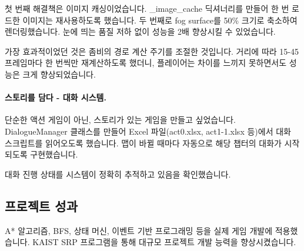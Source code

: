첫 번째 해결책은 이미지 캐싱이었습니다. \_image\_cache 딕셔너리를 만들어 한 번 로드한 이미지는 재사용하도록 했습니다. 두 번째로 fog surface를 50\% 크기로 축소하여 렌더링했습니다. 눈에 띄는 품질 저하 없이 성능을 2배 향상시킬 수 있었습니다.

가장 효과적이었던 것은 좀비의 경로 계산 주기를 조절한 것입니다. 거리에 따라 15-45프레임마다 한 번씩만 재계산하도록 했더니, 플레이어는 차이를 느끼지 못하면서도 성능은 크게 향상되었습니다.

\paragraph{스토리를 담다 - 대화 시스템.}
단순한 액션 게임이 아닌, 스토리가 있는 게임을 만들고 싶었습니다. DialogueManager 클래스를 만들어 Excel 파일(act0.xlsx, act1-1.xlsx 등)에서 대화 스크립트를 읽어오도록 했습니다. 맵이 바뀔 때마다 자동으로 해당 챕터의 대화가 시작되도록 구현했습니다.

대화 진행 상태를 시스템이 정확히 추적하고 있음을 확인했습니다.

\subsection{프로젝트 성과}

A* 알고리즘, BFS, 상태 머신, 이벤트 기반 프로그래밍 등을 실제 게임 개발에 적용했습니다. KAIST SRP 프로그램을 통해 대규모 프로젝트 개발 능력을 향상시켰습니다.

